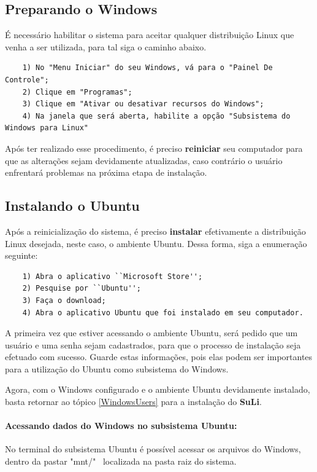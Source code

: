 \documentclass[12pt, a4paper]{article}
\newcommand{\SL}{{\bf SuLi}}
\begin{document}
\subsection{Preparando o Windows}
É necessário habilitar o sistema para aceitar qualquer distribuição Linux que venha a ser utilizada, para tal siga o caminho abaixo.

\begin{verbatim}
	1) No "Menu Iniciar" do seu Windows, vá para o "Painel De Controle";
	2) Clique em "Programas";
	3) Clique em "Ativar ou desativar recursos do Windows";
	4) Na janela que será aberta, habilite a opção "Subsistema do Windows para Linux"
\end{verbatim}
Após ter realizado esse procedimento, é preciso \textbf{reiniciar} seu computador para que as alterações sejam devidamente atualizadas, caso contrário o usuário enfrentará problemas na próxima etapa de instalação.



\subsection{Instalando o Ubuntu} Após a reinicialização do sistema, é preciso \textbf{instalar} efetivamente a distribuição Linux desejada, neste caso, o ambiente Ubuntu. Dessa forma, siga a enumeração seguinte:

\begin{verbatim}
	1) Abra o aplicativo ``Microsoft Store'';
	2) Pesquise por ``Ubuntu'';
	3) Faça o download;
	4) Abra o aplicativo Ubuntu que foi instalado em seu computador.
\end{verbatim}

A primeira vez que estiver acessando o ambiente Ubuntu, será pedido que um usuário e uma senha sejam cadastrados, para que o processo de instalação seja efetuado com sucesso. Guarde estas informações, pois elas podem ser importantes para a utilização do Ubuntu como subsistema do Windows.

Agora, com o Windows configurado e o ambiente Ubuntu devidamente instalado, basta retornar ao tópico \ref{WindowsUsers} para a instalação do \SL. 

\paragraph{Acessando dados do Windows no subsistema Ubuntu:} No terminal  do subsistema Ubuntu é possível acessar os arquivos do Windows, dentro da pastar "mnt/"~ localizada na pasta raiz do sistema.
\end{document}
